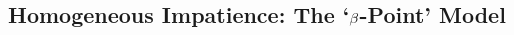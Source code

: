 \documentclass[12pt,titlepage]{econtex}
\renewcommand{\ptyLev}{\ensuremath{Z}} %
\begin{document}

\subsection{Homogeneous Impatience: The `$\beta$-Point' Model} \label{subsec:homoImp}
\end{document}

